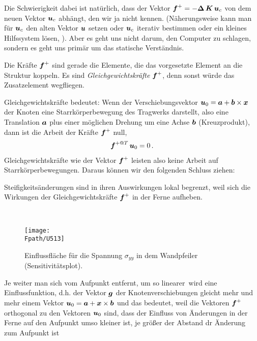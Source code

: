 {{Die Schwierigkeit dabei ist nat\"{u}rlich, dass der Vektor $\mbox{\boldmath $f$}^+ = -\mbox{\boldmath $\Delta$}\,\mbox{\boldmath $K$}\,\mbox{\boldmath $u$}_c$ von dem neuen Vektor $\mbox{\boldmath $u$}_c$ abh\"{a}ngt, den wir ja nicht kennen. (N\"{a}herungsweise kann man f\"{u}r $\mbox{\boldmath $u$}_c$ den alten Vektor $\mbox{\boldmath $u$}$ setzen oder $\mbox{\boldmath $u$}_c$ iterativ bestimmen oder ein kleines Hilfssystem l\"{o}sen, \cite{HaJa2}). Aber es geht uns nicht darum, den Computer zu schlagen, sondern es geht uns prim\"{a}r um das statische Verst\"{a}ndnis.

Die Kr\"{a}fte $\mbox{\boldmath $f$}^+$ sind gerade die Elemente, die das vorgesetzte Element an die Struktur koppeln. Es sind {\em Gleichgewichts\-kr\"{a}fte\/} $\mbox{\boldmath $f$}^+$, denn sonst w\"{u}rde das Zusatzelement wegfliegen.

Gleichgewichtskr\"{a}fte bedeutet: Wenn der Verschiebungsvektor $\mbox{\boldmath $u$}_0 = \mbox{\boldmath $a$} + \mbox{\boldmath $b$} \times \mbox{\boldmath $x$}$ der Knoten eine Starrk\"{o}rperbewegung des Tragwerks darstellt, also eine Translation $\mbox{\boldmath $a$}$ plus einer m\"{o}glichen Drehung um eine Achse $\mbox{\boldmath $b$}$ (Kreuzprodukt), dann ist die Arbeit der Kr\"{a}fte $\mbox{\boldmath $f$}^{+}$ null,
\begin{align}
\mbox{\boldmath $f$}^{+@T}\,\mbox{\boldmath $u$}_0 = 0\,.
\end{align}
Gleichgewichtskr\"{a}fte wie der Vektor $\mbox{\boldmath $f$}^+$ leisten also keine Arbeit auf Starrk\"{o}rperbewegungen. Daraus k\"{o}nnen wir den folgenden Schluss  ziehen: \\

\hspace*{-12pt}\colorbox{highlightBlue}{\parbox{0.98\textwidth}{
{Steifigkeits\"{a}nderungen sind in ihren Auswirkungen lokal begrenzt, weil sich die Wirkungen der Gleichgewichtskr\"{a}fte $\mbox{\boldmath $f$}^+$ in der Ferne aufheben.}}}\\

\begin{figure}[tbp]
\centering
\if {} \sidecaption \fi
\texttt{[image: \\Fpath/U513]}
\caption{Einflussfl\"{a}che f\"{u}r die Spannung $\sigma_{yy}$ in dem Wandpfeiler (Sensitivit\"{a}tsplot). }
\label{U513}
\end{figure}%

Je weiter man sich vom Aufpunkt entfernt, um so \glq linearer\grq\ wird eine Einflussfunktion, d.h. der Vektor $\mbox{\boldmath $g$}$ der Knotenverschiebungen gleicht mehr und mehr einem Vektor $\mbox{\boldmath $u$}_0= \mbox{\boldmath $a$} + \mbox{\boldmath $x$} \times \mbox{\boldmath $b$}$ und das bedeutet, weil die Vektoren $\mbox{\boldmath $f$}^+$ orthogonal zu den Vektoren $\mbox{\boldmath $u$}_0$ sind, dass der Einfluss von \"{A}nderungen \glq in der Ferne\grq{} auf den Aufpunkt umso kleiner ist, je gr\"{o}{\ss}er der Abstand dr \"{A}nderung zum Aufpunkt ist\\

}}
